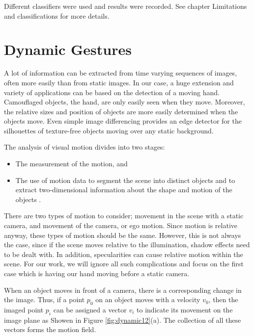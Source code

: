 \documentclass[12pt,fleqn]{book} %
\begin{document}
\bigskip
 
Different classifiers were used and results were recorded. See chapter Limitations and classifications for more details.
\bigskip



\section{Dynamic Gestures}
A lot of information can be extracted from time varying sequences of images, often more easily than from static images. In our case, a huge extension and variety of applications can be based on the detection of a moving hand. Camouflaged objects, the hand, are only easily seen when they move. Moreover, the relative sizes and position of objects are more easily determined when the objects move. Even simple image differencing provides an edge detector for the silhouettes of texture-free objects moving over any static background.\bigskip

The analysis of visual motion divides into two stages:
\begin{itemize}
\item The measurement of the motion, and 
\item The use of motion data to segment the scene into distinct objects and to extract two-dimensional information about the shape and motion of the objects \cite{dynamic1}.
\end{itemize}
\bigskip

There are two types of motion to consider; movement in the scene with a static camera, and movement of the camera, or ego motion. Since motion is relative anyway, these types of motion should be the same. However, this is not always the case, since if the scene moves relative to the illumination, shadow effects need to be dealt with. In addition, specularities can cause relative motion within the scene. For our work, we will ignore all such complications and focus on the first case which is having our hand moving before a static camera.\bigskip

When an object moves in front of a camera, there is a corresponding change in the image. Thus, if a point $p_0$ on an object moves with a velocity $v_0$, then the imaged point $p_i$ can be assigned a vector $v_i$ to indicate its movement on the image plane as Showen in Figure \ref{fig:dynamic12}(a). The collection of all these vectors forms the motion field.
\end{document}
